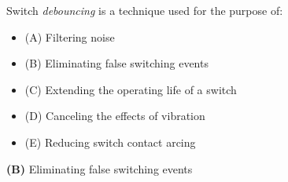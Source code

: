 

Switch {\it debouncing} is a technique used for the purpose of:

\begin{itemize}
\item{(A)} Filtering noise
\vskip 5pt 
\item{(B)} Eliminating false switching events
\vskip 5pt 
\item{(C)} Extending the operating life of a switch
\vskip 5pt 
\item{(D)} Canceling the effects of vibration
\vskip 5pt 
\item{(E)} Reducing switch contact arcing
\end{itemize}







{\bf (B)} Eliminating false switching events
 










